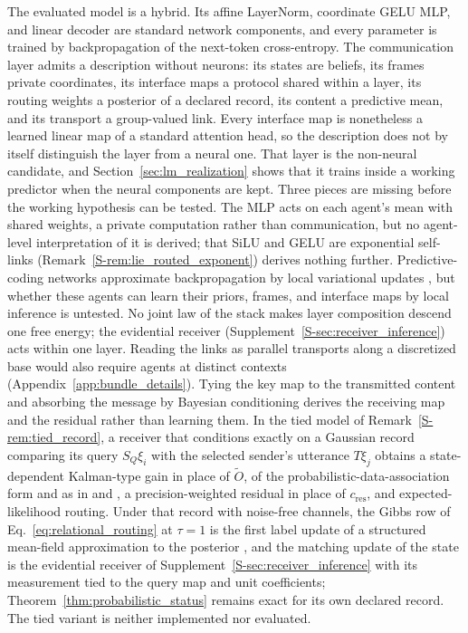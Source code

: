 \documentclass[twoside,11pt]{article}
\begin{document}
The evaluated model is a hybrid. Its affine LayerNorm, coordinate GELU MLP, and linear decoder are standard network components, and every parameter is trained by backpropagation of the next-token cross-entropy. The communication layer admits a description without neurons: its states are beliefs, its frames private coordinates, its interface maps a protocol shared within a layer, its routing weights a posterior of a declared record, its content a predictive mean, and its transport a group-valued link. Every interface map is nonetheless a learned linear map of a standard attention head, so the description does not by itself distinguish the layer from a neural one. That layer is the non-neural candidate, and Section~\ref{sec:lm_realization} shows that it trains inside a working predictor when the neural components are kept. Three pieces are missing before the working hypothesis can be tested. The MLP acts on each agent's mean with shared weights, a private computation rather than communication, but no agent-level interpretation of it is derived; that SiLU and GELU are exponential self-links (Remark~\ref{S-rem:lie_routed_exponent}) derives nothing further. Predictive-coding networks approximate backpropagation by local variational updates \citep{Whittington2017PCBackprop,Millidge2022PCBackprop}, but whether these agents can learn their priors, frames, and interface maps by local inference is untested. No joint law of the stack makes layer composition descend one free energy; the evidential receiver (Supplement~\ref{S-sec:receiver_inference}) acts within one layer. Reading the links as parallel transports along a discretized base would also require agents at distinct contexts (Appendix~\ref{app:bundle_details}). Tying the key map to the transmitted content and absorbing the message by Bayesian conditioning derives the receiving map and the residual rather than learning them. In the tied model of Remark~\ref{S-rem:tied_record}, a receiver that conditions exactly on a Gaussian record comparing its query $S_Q\xi_i$ with the selected sender's utterance $T\xi_j$ obtains a state-dependent Kalman-type gain \citep{Kalman1960} in place of $\widetilde O$, of the probabilistic-data-association form \citep{BarShalom1975PDAF} and as in \citet{Racioppo2025RobustFilter} and \citet{Long2026PrecisionTracked}, a precision-weighted residual in place of $c_{\mathrm{res}}$, and expected-likelihood routing. Under that record with noise-free channels, the Gibbs row of Eq.~\eqref{eq:relational_routing} at $\tau=1$ is the first label update of a structured mean-field approximation to the posterior \citep{Singh2023ImplicitStructuralInference}, and the matching update of the state is the evidential receiver of Supplement~\ref{S-sec:receiver_inference} with its measurement tied to the query map and unit coefficients; Theorem~\ref{thm:probabilistic_status} remains exact for its own declared record. The tied variant is neither implemented nor evaluated.
\end{document}
